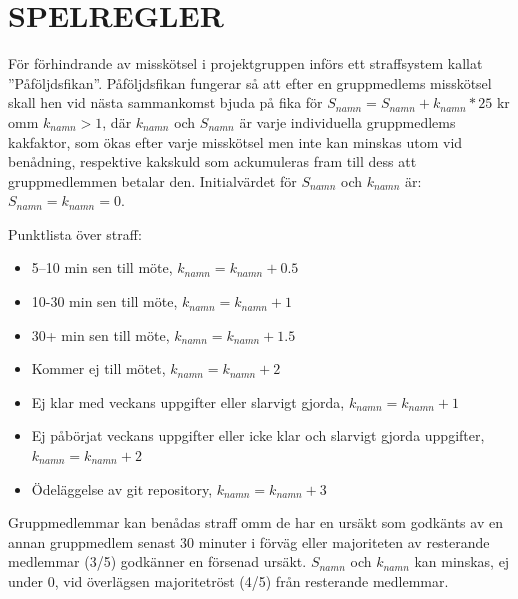 \documentclass[a4paper]{article}
\begin{document}
\section{SPELREGLER}
\label{sec:spelregler}

För förhindrande av misskötsel i projektgruppen införs ett straffsystem kallat ”Påföljdsfikan”. Påföljdsfikan fungerar så att efter en gruppmedlems misskötsel skall hen vid nästa sammankomst bjuda på fika för $S_{namn} = S_{namn} + k_{namn}*25$ kr omm $k_{namn}>1$, där $k_{namn}$ och $S_{namn}$ är varje individuella gruppmedlems kakfaktor, som ökas efter varje misskötsel men inte kan minskas utom vid benådning, respektive kakskuld som ackumuleras fram till dess att gruppmedlemmen betalar den. Initialvärdet för $S_{namn}$ och $k_{namn}$ är: $S_{namn}=k_{namn}=0.$\\ \par
Punktlista över straff:
\begin{itemize}
	\item 5–10 min sen till möte, $k_{namn} = k_{namn} + 0.5$
	\item 10-30 min sen till möte, $k_{namn} = k_{namn} + 1$
	\item 30+ min sen till möte, $k_{namn} = k_{namn} + 1.5$
	\item Kommer ej till mötet, $k_{namn} = k_{namn} + 2$
	\item Ej klar med veckans uppgifter eller slarvigt gjorda, $k_{namn} = k_{namn} + 1$
	\item Ej påbörjat veckans uppgifter eller icke klar och slarvigt gjorda uppgifter, \indent $k_{namn} = k_{namn} + 2$
	\item Ödeläggelse av git repository, $k_{namn} = k_{namn} + 3$
\end{itemize}
\par
Gruppmedlemmar kan benådas straff omm de har en ursäkt som godkänts av en annan gruppmedlem senast 30 minuter i förväg eller majoriteten av resterande medlemmar (3/5) godkänner en försenad ursäkt. $S_{namn}$ och $k_{namn}$ kan minskas, ej under 0, vid överlägsen majoritetröst (4/5) från resterande medlemmar.



%
%
\end{document}

